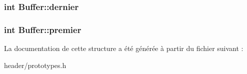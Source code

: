 \subsubsection[{\texorpdfstring{dernier}{dernier}}]{\setlength{\rightskip}{0pt plus 5cm}int Buffer\+::dernier}\hypertarget{structBuffer_a837b38f7ae7ac04da3a2cbe9a335aa03}{}\label{structBuffer_a837b38f7ae7ac04da3a2cbe9a335aa03}
\subsubsection[{\texorpdfstring{premier}{premier}}]{\setlength{\rightskip}{0pt plus 5cm}int Buffer\+::premier}\hypertarget{structBuffer_a602dbfdc9aa40beec34f827f0a96a18a}{}\label{structBuffer_a602dbfdc9aa40beec34f827f0a96a18a}


La documentation de cette structure a été générée à partir du fichier suivant \+:\begin{DoxyCompactItemize}
\item 
header/prototypes.\+h\end{DoxyCompactItemize}
